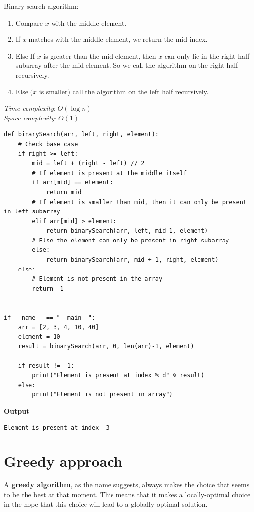 \documentclass[a4paper,11pt]{book}
\begin{document}
\noindent Binary search algorithm:
\begin{enumerate}
    \item Compare $x$ with the middle element.
    \item If $x$ matches with the middle element, we return the mid index.
    \item Else If $x$ is greater than the mid element, then $x$ can only lie in the right half subarray after the mid element. So we call the algorithm on the right half recursively.
    \item Else ($x$ is smaller) call the algorithm on the left half recursively.
\end{enumerate}
\vspace{5mm}

\noindent \textit{Time complexity}: $O(\log n)$\\
\noindent \textit{Space complexity}: $O(1)$

\begin{lstlisting}
def binarySearch(arr, left, right, element):
    # Check base case
    if right >= left:
        mid = left + (right - left) // 2
        # If element is present at the middle itself
        if arr[mid] == element:
            return mid
        # If element is smaller than mid, then it can only be present in left subarray
        elif arr[mid] > element:
            return binarySearch(arr, left, mid-1, element)
        # Else the element can only be present in right subarray
        else:
            return binarySearch(arr, mid + 1, right, element)
    else:
        # Element is not present in the array
        return -1
  
  
if __name__ == "__main__":
    arr = [2, 3, 4, 10, 40]
    element = 10
    result = binarySearch(arr, 0, len(arr)-1, element)
    
    if result != -1:
        print("Element is present at index % d" % result)
    else:
        print("Element is not present in array")
\end{lstlisting}
\textbf{Output}
\begin{lstlisting}
Element is present at index  3
\end{lstlisting}

\section{Greedy approach}

\noindent A \textbf{greedy algorithm}, as the name suggests, always makes the choice that seems to be the best at that moment. This means that it makes a locally-optimal choice in the hope that this choice will lead to a globally-optimal solution.
\end{document}
